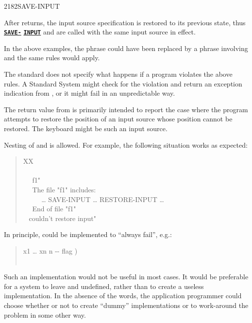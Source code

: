 \begin{worddef}{2182}{SAVE-INPUT}
\begin{rationale}
		After  returns, the input source specification
		is restored to its previous state, thus
		\hyperref{}{core}{SAVE-INPUT}{\textbf{\texttt{SAVE-}}}
		\hyperref{}{core}{SAVE-INPUT}{\textbf{\texttt{INPUT}}}
		and  are called with the same input source
		in effect.

		In the above examples, the  phrase could have
		been replaced by a phrase involving 
		and the same rules would apply.

		The standard does not specify what happens if a program
		violates the above rules. A Standard System might check for
		the violation and return an exception indication from
		, or it might fail in an unpredictable
		way.

		The return value from  is primarily
		intended to report the case where the program attempts to
		restore the position of an input source whose position cannot
		be restored. The keyboard might be such an input source.

		Nesting of  and  is
		allowed. For example, the following situation works as
		expected:

		\begin{quote}\ttfamily
			\word{:} XX \\
			\tab {} \\
			\tab~~  f1"  \\
			\tab~~  The file "f1" includes: \\
			\tab~~  ~~ {\ldots} SAVE-INPUT {\ldots} RESTORE-INPUT {\ldots} \\
			\tab~~  End of file "f1" \\
			\tab {} ~  couldn't restore input" \\
			\word{;}
		\end{quote}

		In principle,  could be implemented to
		``always fail'', e.g.:

		\begin{quote}\ttfamily
			\word{:}   x1 {\ldots} xn n -{}- flag ) \\
			     \\
			\word{;}
		\end{quote}

		Such an implementation would not be useful in most cases. It
		would be preferable for a system to leave 
		and  undefined, rather than to create a
		useless implementation. In the absence of the words, the
		application programmer could choose whether or not to create
		``dummy'' implementations or to work-around the problem in
		some other way.


\end{rationale}
\end{worddef}
